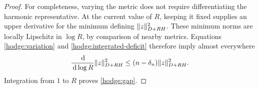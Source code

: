 \begin{proof}
For completeness, varying the metric does not require differentiating
the harmonic representative.  At the current value of $R$, keeping it
fixed supplies an upper derivative for the minimum defining
$\lVert z\rVert_{D+RH}^2$.  These minimum norms are locally Lipschitz in
$\log R$, by comparison of nearby metrics.  Equations
\eqref{hodge:variation} and \eqref{hodge:integrated-deficit} therefore
imply almost everywhere
\[
 \frac{\,\mathrm d}{\,\mathrm d\log R}\lVert z\rVert_{D+RH}^2
 \le(n-\delta_n)\lVert z\rVert_{D+RH}^2.
\]
Integration from $1$ to $R$ proves \eqref{hodge:gap}.
\end{proof}
